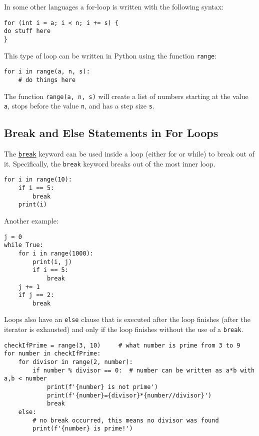 \documentclass[12pt, a4paper]{article}
\begin{document}
In some other languages a for-loop is written with the following syntax:
\lstset{language=jupyter-python,label= ,caption= ,captionpos=b,numbers=none}
\begin{lstlisting}
for (int i = a; i < n; i += s) {
do stuff here
}
\end{lstlisting}

This type of loop can be written in Python using the function \texttt{range}:
\lstset{language=jupyter-python,label= ,caption= ,captionpos=b,numbers=none}
\begin{lstlisting}
for i in range(a, n, s):
    # do things here
\end{lstlisting}
The function \texttt{range(a, n, s)} will create a list of numbers starting at the value \texttt{a}, stops before the value \texttt{n}, and has a step size \texttt{s}.
\subsection{Break and Else Statements in For Loops}
\label{sec:orge61baae}
The \href{https://docs.python.org/3.6/tutorial/controlflow.html?\#break-and-continue-statements-and-else-clauses-on-loops}{\texttt{break}} keyword can be used inside a loop (either for or while) to break out of it.
Specifically, the \texttt{break} keyword breaks out of the most inner loop.
\lstset{language=jupyter-python,label= ,caption= ,captionpos=b,numbers=none}
\begin{lstlisting}
for i in range(10):
    if i == 5:
        break
    print(i)
\end{lstlisting}
Another example:
\lstset{language=jupyter-python,label= ,caption= ,captionpos=b,numbers=none}
\begin{lstlisting}
j = 0
while True:
    for i in range(1000):
        print(i, j)
        if i == 5:
            break
    j += 1
    if j == 2:
        break
\end{lstlisting}

Loops also have an \texttt{else} clause that is executed after the loop finishes (after the iterator is exhausted) and only if the loop finishes without the use of a \texttt{break}.
\lstset{language=jupyter-python,label= ,caption= ,captionpos=b,numbers=none}
\begin{lstlisting}
checkIfPrime = range(3, 10)     # what number is prime from 3 to 9
for number in checkIfPrime:
    for divisor in range(2, number):
        if number % divisor == 0:  # number can be written as a*b with a,b < number
            print(f'{number} is not prime')
            print(f'{number}={divisor}*{number//divisor}')
            break
    else:
        # no break occurred, this means no divisor was found
        print(f'{number} is prime!')
\end{lstlisting}
\end{document}
